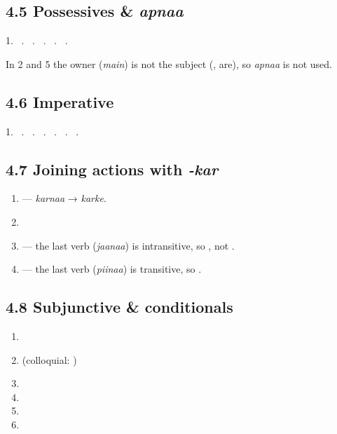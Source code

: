 \subsection{4.5 Possessives \& \textit{apnaa}}
1.\  .\  .\  .\  .\  .\ 

\noindent In 2 and 5 the owner (\textit{main}) is not the subject (,  are), so \textit{apnaa} is not used.

\subsection{4.6 Imperative}
1.\  .\  .\  .\  .\  .\  .\ 

\subsection{4.7 Joining actions with \textit{-kar}}
\begin{enumerate}
  \item {} — \textit{karnaa} → \textit{karke}.
  \item {}
  \item {} — the last verb (\textit{jaanaa}) is intransitive, so , not .
  \item {} — the last verb (\textit{piinaa}) is transitive, so .
\end{enumerate}

\subsection{4.8 Subjunctive \& conditionals}
\begin{enumerate}
  \item {}
  \item {} (colloquial: )
  \item {}
  \item {}
  \item {}
  \item {}
\end{enumerate}

